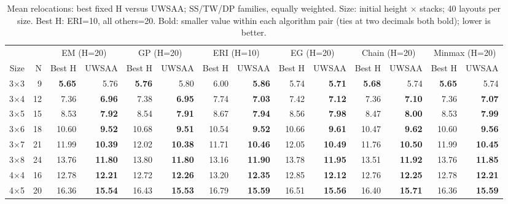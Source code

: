 \begin{table}[t]
\centering\scriptsize
\caption{Mean relocations: best fixed H versus UWSAA; SS/TW/DP families, equally weighted. Size: initial height $\times$ stacks; 40 layouts per size. Best H: ERI=10, all others=20. Bold: smaller value within each algorithm pair (ties at two decimals both bold); lower is better.}
\setlength{\tabcolsep}{4pt}
\begin{tabular}{rrrrrrrrrrrrrr}
\toprule
 &  & \multicolumn{2}{c}{EM (H=20)} & \multicolumn{2}{c}{GP (H=20)} & \multicolumn{2}{c}{ERI (H=10)} & \multicolumn{2}{c}{EG (H=20)} & \multicolumn{2}{c}{Chain (H=20)} & \multicolumn{2}{c}{Minmax (H=20)} \\
\cmidrule(lr){3-4} \cmidrule(lr){5-6} \cmidrule(lr){7-8} \cmidrule(lr){9-10} \cmidrule(lr){11-12} \cmidrule(lr){13-14}
Size & N & Best H & UWSAA & Best H & UWSAA & Best H & UWSAA & Best H & UWSAA & Best H & UWSAA & Best H & UWSAA \\
\midrule
3$\times$3 & 9 & \textbf{5.65} & 5.76 & \textbf{5.76} & 5.80 & 6.00 & \textbf{5.86} & 5.74 & \textbf{5.71} & \textbf{5.68} & 5.74 & \textbf{5.65} & 5.74 \\
3$\times$4 & 12 & 7.36 & \textbf{6.96} & 7.38 & \textbf{6.95} & 7.74 & \textbf{7.03} & 7.42 & \textbf{7.12} & 7.36 & \textbf{7.10} & 7.36 & \textbf{7.07} \\
3$\times$5 & 15 & 8.53 & \textbf{7.92} & 8.54 & \textbf{7.91} & 8.67 & \textbf{7.94} & 8.56 & \textbf{7.98} & 8.47 & \textbf{8.00} & 8.53 & \textbf{7.99} \\
3$\times$6 & 18 & 10.60 & \textbf{9.52} & 10.68 & \textbf{9.51} & 10.54 & \textbf{9.52} & 10.66 & \textbf{9.61} & 10.47 & \textbf{9.62} & 10.60 & \textbf{9.56} \\
3$\times$7 & 21 & 11.99 & \textbf{10.39} & 12.02 & \textbf{10.38} & 11.71 & \textbf{10.46} & 12.05 & \textbf{10.49} & 11.76 & \textbf{10.50} & 11.99 & \textbf{10.45} \\
3$\times$8 & 24 & 13.76 & \textbf{11.80} & 13.80 & \textbf{11.80} & 13.16 & \textbf{11.90} & 13.78 & \textbf{11.95} & 13.51 & \textbf{11.92} & 13.76 & \textbf{11.85} \\
4$\times$4 & 16 & 12.78 & \textbf{12.21} & 12.72 & \textbf{12.26} & 13.20 & \textbf{12.35} & 12.85 & \textbf{12.12} & 12.76 & \textbf{12.25} & 12.78 & \textbf{12.21} \\
4$\times$5 & 20 & 16.36 & \textbf{15.54} & 16.43 & \textbf{15.53} & 16.79 & \textbf{15.59} & 16.51 & \textbf{15.56} & 16.40 & \textbf{15.71} & 16.36 & \textbf{15.59} \\

\end{tabular}
\end{table}
